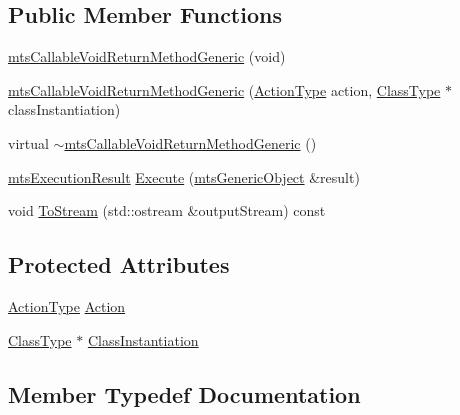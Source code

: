 \subsection*{Public Member Functions}
\begin{DoxyCompactItemize}
\item 
\hyperlink{classmts_callable_void_return_method_generic_a1f1a1a91485ab54baff1e281b4faab27}{mts\+Callable\+Void\+Return\+Method\+Generic} (void)
\item 
\hyperlink{classmts_callable_void_return_method_generic_a3bd1896e16edc15bc0fe7c9a61c7bab6}{mts\+Callable\+Void\+Return\+Method\+Generic} (\hyperlink{classmts_callable_void_return_method_generic_ad94bb941833d1c2d74bb718f3bf81456}{Action\+Type} action, \hyperlink{classmts_callable_void_return_method_generic_ac65a16eb6baf786e6eba07bb920cbf1f}{Class\+Type} $\ast$class\+Instantiation)
\item 
virtual \hyperlink{classmts_callable_void_return_method_generic_ab6e18a6783eb48a89decdfd7356ba62b}{$\sim$mts\+Callable\+Void\+Return\+Method\+Generic} ()
\item 
\hyperlink{classmts_execution_result}{mts\+Execution\+Result} \hyperlink{classmts_callable_void_return_method_generic_a91f3095091379fafba6adea4676d4019}{Execute} (\hyperlink{classmts_generic_object}{mts\+Generic\+Object} \&result)
\item 
void \hyperlink{classmts_callable_void_return_method_generic_aac08fdc349e9cea779f98809fa77ba44}{To\+Stream} (std\+::ostream \&output\+Stream) const 
\end{DoxyCompactItemize}
\subsection*{Protected Attributes}
\begin{DoxyCompactItemize}
\item 
\hyperlink{classmts_callable_void_return_method_generic_ad94bb941833d1c2d74bb718f3bf81456}{Action\+Type} \hyperlink{classmts_callable_void_return_method_generic_a3d55827aaf012a7732d1956ef5ff583e}{Action}
\item 
\hyperlink{classmts_callable_void_return_method_generic_ac65a16eb6baf786e6eba07bb920cbf1f}{Class\+Type} $\ast$ \hyperlink{classmts_callable_void_return_method_generic_a15414bc65b1c9d9b97b8cfcbc7c3b2d8}{Class\+Instantiation}
\end{DoxyCompactItemize}


\subsection{Member Typedef Documentation}
\hypertarget{classmts_callable_void_return_method_generic_ad94bb941833d1c2d74bb718f3bf81456}{}
